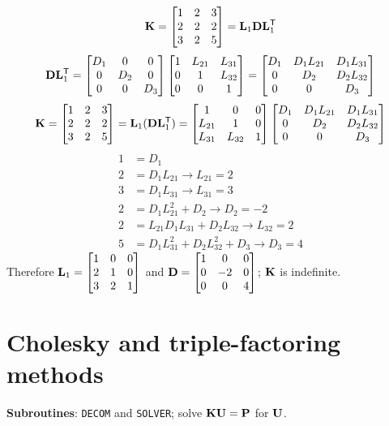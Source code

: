 \begin{example}
\begin{equation*}
  \mathbf{K} = \begin{bmatrix}1 & 2 & 3\\ 2 & 2 & 2\\ 3 & 2 & 5\end{bmatrix} = \mathbf{L}_1\mathbf{D}\mathbf{L}_1^{\mathsf{T}}
\end{equation*}
\begin{equation*}
  \mathbf{D}\mathbf{L}_1^{\mathsf{T}} = \begin{bmatrix}D_1 & 0 & 0\\ 0 & D_2 & 0\\ 0 & 0 & D_3\end{bmatrix}\begin{bmatrix}1 & L_{21} & L_{31}\\ 0 & 1 & L_{32}\\ 0 & 0 & 1\end{bmatrix}
  = \begin{bmatrix}D_1 & D_1L_{21} & D_1L_{31}\\ 0 & D_2 & D_2L_{32}\\ 0 & 0 & D_3\end{bmatrix}
\end{equation*}
\begin{equation*}
  \mathbf{K} = \begin{bmatrix}1 & 2 & 3\\ 2 & 2 & 2\\ 3 & 2 & 5\end{bmatrix} = \mathbf{L}_1(\mathbf{D}\mathbf{L}_1^{\mathsf{T}})
  = \begin{bmatrix}1 & 0 & 0\\ L_{21} & 1 & 0\\ L_{31} & L_{32} & 1\end{bmatrix}\begin{bmatrix}D_1 & D_1L_{21} & D_1L_{31}\\ 0 & D_2 & D_2L_{32}\\ 0 & 0 & D_3\end{bmatrix}
\end{equation*}
\begin{align*}
  1 &= D_1\\
  2 &= D_1L_{21} \rightarrow L_{21} = 2\\
  3 &= D_1L_{31} \rightarrow L_{31} = 3\\
  2 &= D_1L_{21}^2 + D_2 \rightarrow D_2 = -2\\
  2 &= L_{21}D_1L_{31} + D_2L_{32} \rightarrow L_{32} = 2\\
  5 &= D_1L_{31}^2 + D_2L_{32}^2 + D_3 \rightarrow D_3 = 4
\end{align*}
Therefore $\mathbf{L}_1 = \begin{bmatrix}1 & 0 & 0\\ 2 & 1 & 0\\ 3 & 2 & 1\end{bmatrix}$ and $\mathbf{D} = \begin{bmatrix}1 & 0 & 0\\ 0 & -2 & 0\\ 0 & 0 & 4\end{bmatrix}$; $\mathbf{K}$ is indefinite.
\end{example}

\section{Cholesky and triple-factoring methods}
\label{sec:cholesky-triple}
\textbf{Subroutines}: \texttt{DECOM} and \texttt{SOLVER}; solve $\mathbf{K}\mathbf{U} = \mathbf{P}$ for $\mathbf{U}$.

